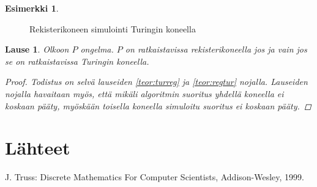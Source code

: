 \documentclass[a4paper, 12pt]{article}
\theoremstyle{definition}
\newtheorem{example}[mydef]{Esimerkki}
\theoremstyle{plain}
\newtheorem{teor}[mydef]{Lause}
\begin{document}
\begin{example}
\begin{figure}[tb]
\caption{Rekisterikoneen simulointi Turingin koneella}
\end{figure}

\end{example}

\begin{teor}
Olkoon $P$ ongelma. $P$ on ratkaistavissa rekisterikoneella jos ja vain jos se on ratkaistavissa Turingin koneella.
\begin{proof}
Todistus on selvä lauseiden \ref{teor:turreg} ja \ref{teor:regtur} nojalla. Lauseiden nojalla havaitaan myös, että mikäli algoritmin suoritus yhdellä koneella ei koskaan pääty, myöskään toisella koneella simuloitu suoritus ei koskaan pääty.
\end{proof}
\end{teor}

\appendix

\section{Lähteet}
J. Truss: Discrete Mathematics For Computer Scientists, Addison-Wesley, 1999.
\end{document}
